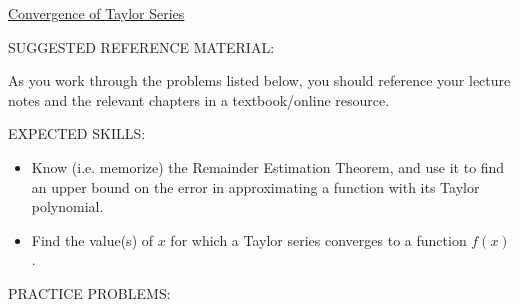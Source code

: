 \documentclass[12pt]{article}
\begin{document}
\begin{center}
\underline{\LARGE{Convergence of Taylor Series}}
\end{center}

\noindent SUGGESTED REFERENCE MATERIAL:

\medskip

\noindent As you work through the problems listed below, you should reference your lecture notes and the relevant chapters in a textbook/online resource.

\medskip

\noindent EXPECTED SKILLS:

\medskip

\begin{itemize}[topsep=0pt]

\item Know (i.e. memorize) the Remainder Estimation Theorem, and use it to find an upper bound on the error in approximating a function with its Taylor polynomial.

\item Find the value(s) of $x$ for which a Taylor series converges to a function $f(x)$.

\end{itemize}

\medskip

\noindent PRACTICE PROBLEMS:

\medskip
\end{document}
